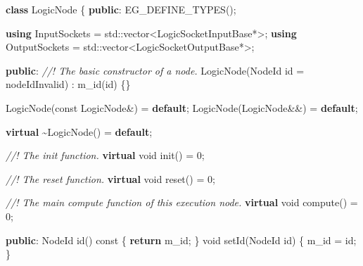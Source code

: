 \documentclass[
  12pt,
  british,
  paper=a4,
  twoside,
  titlepage=true,
  openright,
  abstract=on,
  toc=listofnumbered,
  numbers=noenddot,
  chapterprefix=true,
  headings=optiontohead,
  svgnames,
  dvipsnames]{scrreprt}
\newenvironment{Shaded}{}{}
\newcommand{\AttributeTok}[1]{\textcolor[rgb]{0.49,0.56,0.16}{#1}}
\newcommand{\BuiltInTok}[1]{#1}
\newcommand{\CommentTok}[1]{\textcolor[rgb]{0.38,0.63,0.69}{\textit{#1}}}
\newcommand{\ControlFlowTok}[1]{\textcolor[rgb]{0.00,0.44,0.13}{\textbf{#1}}}
\newcommand{\DataTypeTok}[1]{\textcolor[rgb]{0.56,0.13,0.00}{#1}}
\newcommand{\DecValTok}[1]{\textcolor[rgb]{0.25,0.63,0.44}{#1}}
\newcommand{\KeywordTok}[1]{\textcolor[rgb]{0.00,0.44,0.13}{\textbf{#1}}}
\newcommand{\NormalTok}[1]{#1}
\newcommand{\OperatorTok}[1]{\textcolor[rgb]{0.40,0.40,0.40}{#1}}
\newcommand{\VariableTok}[1]{\textcolor[rgb]{0.10,0.09,0.49}{#1}}
\begin{document}
\begin{Shaded}
\begin{Highlighting}[numbers=left,,]
\KeywordTok{class}\NormalTok{ LogicNode}
\OperatorTok{\{}
\KeywordTok{public}\OperatorTok{:}
\NormalTok{    EG\_DEFINE\_TYPES}\OperatorTok{();}

    \KeywordTok{using}\NormalTok{ InputSockets  }\OperatorTok{=} \BuiltInTok{std::}\NormalTok{vector}\OperatorTok{\textless{}}\NormalTok{LogicSocketInputBase}\OperatorTok{*\textgreater{};}
    \KeywordTok{using}\NormalTok{ OutputSockets }\OperatorTok{=} \BuiltInTok{std::}\NormalTok{vector}\OperatorTok{\textless{}}\NormalTok{LogicSocketOutputBase}\OperatorTok{*\textgreater{};}

\KeywordTok{public}\OperatorTok{:}
    \CommentTok{//! The basic constructor of a node.}
\NormalTok{    LogicNode}\OperatorTok{(}\NormalTok{NodeId id }\OperatorTok{=}\NormalTok{ nodeIdInvalid}\OperatorTok{)}
        \OperatorTok{:} \VariableTok{m\_id}\OperatorTok{(}\NormalTok{id}\OperatorTok{)}
    \OperatorTok{\{\}}

\NormalTok{    LogicNode}\OperatorTok{(}\AttributeTok{const}\NormalTok{ LogicNode}\OperatorTok{\&)} \OperatorTok{=} \ControlFlowTok{default}\OperatorTok{;}
\NormalTok{    LogicNode}\OperatorTok{(}\NormalTok{LogicNode}\OperatorTok{\&\&)}      \OperatorTok{=} \ControlFlowTok{default}\OperatorTok{;}

    \KeywordTok{virtual} \OperatorTok{\textasciitilde{}}\NormalTok{LogicNode}\OperatorTok{()} \OperatorTok{=} \ControlFlowTok{default}\OperatorTok{;}

    \CommentTok{//! The init function.}
    \KeywordTok{virtual} \DataTypeTok{void}\NormalTok{ init}\OperatorTok{()} \OperatorTok{=} \DecValTok{0}\OperatorTok{;}

    \CommentTok{//! The reset function.}
    \KeywordTok{virtual} \DataTypeTok{void}\NormalTok{ reset}\OperatorTok{()} \OperatorTok{=} \DecValTok{0}\OperatorTok{;}

    \CommentTok{//! The main compute function of this execution node.}
    \KeywordTok{virtual} \DataTypeTok{void}\NormalTok{ compute}\OperatorTok{()} \OperatorTok{=} \DecValTok{0}\OperatorTok{;}

\KeywordTok{public}\OperatorTok{:}
\NormalTok{    NodeId id}\OperatorTok{()} \AttributeTok{const} \OperatorTok{\{} \ControlFlowTok{return} \VariableTok{m\_id}\OperatorTok{;} \OperatorTok{\}}
    \DataTypeTok{void}\NormalTok{ setId}\OperatorTok{(}\NormalTok{NodeId id}\OperatorTok{)} \OperatorTok{\{} \VariableTok{m\_id} \OperatorTok{=}\NormalTok{ id}\OperatorTok{;} \OperatorTok{\}}


\end{Highlighting}
\end{Shaded}
\end{document}
